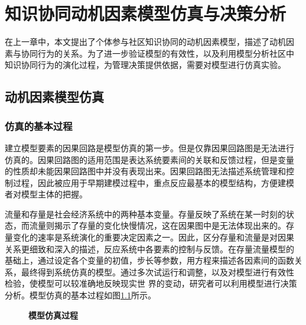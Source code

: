  
\chapter{知识协同动机因素模型仿真与决策分析}
\label{cha:emulation}

在上一章中，本文提出了个体参与社区知识协同的动机因素模型，描述了动机因
素与协同行为的关系。为了进一步验证模型的有效性，以及利用模型分析社区中
知识协同行为的演化过程，为管理决策提供依据，需要对模型进行仿真实验。

\section{动机因素模型仿真}

\subsection{仿真的基本过程}
建立模型要素的因果回路是模型仿真的第一步。但是仅靠因果回路图是无法进行
仿真的。因果回路图的适用范围是表达系统要素间的关联和反馈过程，但是变量
的性质却未能因果回路图中并没有表现出来。因果回路图无法描述系统管理和控
制过程，因此被应用于早期建模过程中，重点反应最基本的模型结构，方便建模
者对模型主体的把握。

流量和存量是社会经济系统中的两种基本变量。存量反映了系统在某一时刻的状
态，而流量则揭示了存量的变化快慢情况，这在因果图中是无法体现出来的。存
量变化的速率是系统演化的重要决定因素之一。因此，区分存量和流量是对因果
关系更细致和深入的描述，反应系统中各要素的控制与反馈。在存量流量模型的
基础上，通过设定各个变量的初值，步长等参数，用方程来描述各因素间的函数关
系，最终得到系统仿真的模型。通过多次试运行和调整，以及对模型进行有效性
检验，使模型可以较准确地反映现实世
界的变动，研究者可以利用模型进行决策分析。模型仿真的基本过程如图\ref{fig:vensim}所示。
\begin{figure}[htb]
  \centering
  \caption{\small{\textbf{模型仿真过程}}}
  \label{fig:vensim}
\end{figure}
